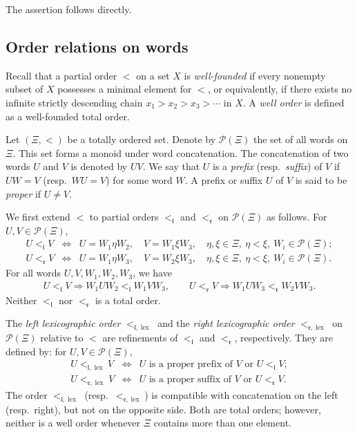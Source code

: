 \documentclass{article}
\makeatletter
\renewenvironment{proof}[1][\proofname]{\par
	\pushQED{\qed}%
	\normalfont \topsep6\p@\@plus6\p@\relax
	\trivlist
	\item[\hskip\labelsep
	\bfseries
	#1\@addpunct{.}]\ignorespaces
}{%
	\popQED\endtrivlist\@endpefalse
}
\theoremstyle{plain}
\theoremstyle{definition}
\numberwithin{equation}{section}
\DeclareMathOperator{\lex}{lex}
\newcommand{\PP}{\mathcal{P}}
\newcommand{\rr}{\mathfrak{r}}
\makeatother
\begin{document}
	\begin{proof}
		The assertion follows directly.
	\end{proof}
	
	
	
	
	\subsection{Order relations on words}
	
	
	Recall that a partial order $<$ on a set $X$ is \emph{well-founded} if every nonempty subset of $X$ possesses a minimal element for $<$, or equivalently, if there exists no infinite strictly descending chain $x_{1}> x_{2}> x_{3}> \cdots$ in $X$. A \emph{well order} is defined as a well-founded total order.
	
	Let $(\Xi, <)$ be a totally ordered set. Denote by $\PP(\Xi)$ the set of all words on $\Xi$. This set forms a monoid under word concatenation. The concatenation of two words $U$ and $V$ is denoted by $UV$. We say that $U$ is a \emph{prefix} (resp.\ \emph{suffix}) of $V$ if $UW = V$ (resp.\ $WU = V$) for some word $W$. A prefix or suffix $U$ of $V$ is said to be \emph{proper} if $U \neq V$.
	
	
	We first extend $<$ to partial orders $<_{\mathfrak{l}}$ and $<_{\rr}$ on $\PP(\Xi)$ as follows. For $U,V\in \PP(\Xi)$,
	\begin{eqnarray*}
		U<_{\mathfrak{l}} V &\Longleftrightarrow&
		U=W_{1}\eta W_{2},\quad V=W_{1}\xi W_{3},\quad \eta, \xi \in\Xi,\ \eta<\xi,\ W_{i}\in\PP(\Xi);\\
		U<_{\rr } V &\Longleftrightarrow&
		U=W_{1}\eta W_{3},\quad V=W_{2}\xi W_{3},\quad \eta, \xi \in\Xi,\ \eta<\xi,\ W_{i}\in\PP(\Xi).
	\end{eqnarray*}
	For all words $U,V,W_{1},W_{2},W_{3}$, we have
	\begin{eqnarray*}
		U<_{\mathfrak{l}} V    \Longrightarrow  W_{1} U W_{2} <_{\mathfrak{l}} W_{1} V W_{3}, \qquad
		U<_{\rr } V    \Longrightarrow  W_{1} U W_{3} <_{\rr } W_{2} V W_{3}.
	\end{eqnarray*}
	Neither $<_{\mathfrak{l}}$ nor $<_{\rr}$ is a total order.
	
	The \emph{left lexicographic order} $<_{\mathfrak{l}, \lex}$ and the
	\emph{right lexicographic order} $<_{\rr , \lex}$ on $\PP(\Xi)$
	relative to $<$ are refinements of $<_{\mathfrak{l}}$ and $<_{\rr}$, respectively. They are defined by: for $U,V\in \PP(\Xi)$,
	\begin{eqnarray*}
		U<_{\mathfrak{l},\lex} V & \Longleftrightarrow &
		U\text{ is a proper prefix of }V \text{ or } U <_{\mathfrak{l}} V; \\
		U<_{\rr ,\lex} V & \Longleftrightarrow &
		U\text{ is a proper suffix of }V \text{ or } U <_{\rr } V.
	\end{eqnarray*}
	The order $<_{\mathfrak{l}, \lex}$ (resp.\ $<_{\rr , \lex}$) is compatible with concatenation on the left (resp.\ right), but not on the opposite side. Both are total orders; however, neither is a well order whenever $\Xi$ contains more than one element.
	
\end{document}
